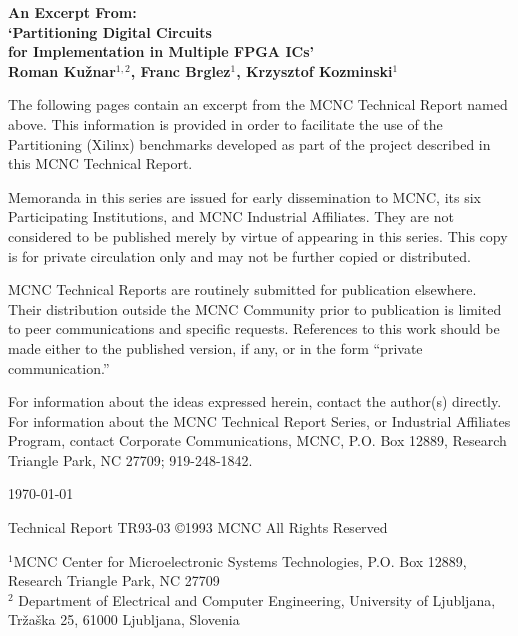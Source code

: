 \begin{titlepage}
\vspace*{0.625in}

\begin{center}
{\Large \bf 
An Excerpt From: \\
\vskip 1.0cm
`Partitioning Digital Circuits   \\
\vskip 0.25cm
for Implementation in Multiple FPGA ICs' \\
}
\vspace{0.75cm}
{\normalsize \bf Roman Ku\v znar$^{1,2}$, Franc Brglez$^{1}$, Krzysztof
Kozminski$^{1}$} 
\vskip 1.0cm
\end{center}
\vspace{0.75in}
\footnotesize{

\indent The following pages contain an excerpt from the MCNC Technical Report
named above. This information is provided in order to facilitate the use of
the Partitioning (Xilinx) benchmarks developed as part of the project
described in this MCNC Technical Report.

\vspace{0.15in}
Memoranda in this series are issued for early dissemination to MCNC,
its six Participating Institutions, and MCNC Industrial Affiliates.
They are not considered to be published merely by virtue of appearing
in this series.  This copy is for private circulation only and may not
be further copied or distributed.

\vspace{0.15in}
MCNC Technical Reports are routinely submitted for publication
elsewhere.  Their distribution outside the MCNC Community prior to
publication is limited to peer communications and specific requests.
References to this work should be made either to the published version,
if any, or in the form ``private communication.''

\vspace{0.15in}
For information about the ideas expressed herein, contact the author(s)
directly.  For information about the MCNC Technical Report Series, or
Industrial Affiliates Program, contact Corporate Communications, MCNC,
P.O. Box 12889, Research Triangle Park, NC 27709; 919-248-1842.

\begin{center}

\vspace{0.25in}
\today

Technical Report TR93-03	
\vskip 0.3cm 
\copyright 1993 MCNC
All Rights Reserved
\end{center}
}

\vspace{0.875in}
\vspace{0.1in}
\footnoterule
\vskip 0.1in  
{\footnotesize 
\noindent
        $^{1}$MCNC Center for Microelectronic Systems Technologies,
        P.O. Box 12889,
        Research Triangle Park, NC 27709 \\

\noindent $^{2}$ Department of Electrical and Computer Engineering,
University of Ljubljana,
                 Tr\v za\v ska 25, 61000 Ljubljana, Slovenia
}
\end{titlepage}


